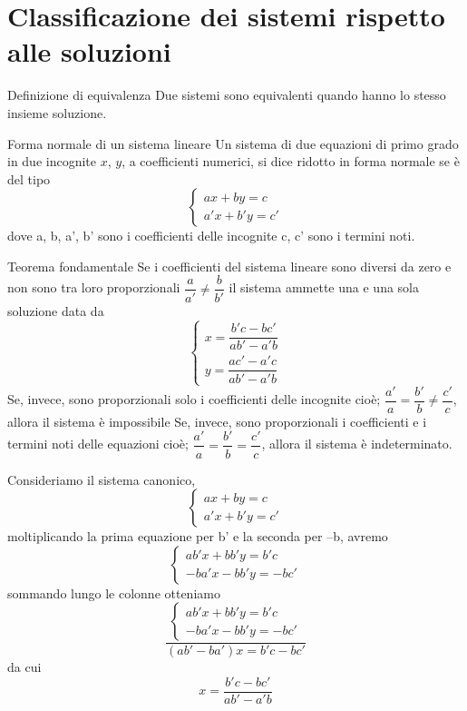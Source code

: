 \section[Classificazione rispetto alle soluzioni]{Classificazione dei sistemi rispetto alle soluzioni}
\begin{definizionet}{Definizione di equivalenza}{}
Due sistemi sono equivalenti quando hanno lo stesso insieme soluzione.
\end{definizionet}
\begin{definizionet}{Forma normale di un sistema lineare}{}
Un sistema di due equazioni di primo grado in due incognite $x$, $y$, a coefficienti numerici, si dice ridotto in forma normale se è del tipo
\[\left\{\begin{array}{l} {ax+by=c} \\ {a'x+b'y=c'}\end{array}\right. \]
dove a, b, a', b' sono i coefficienti delle incognite c, c' sono i termini noti.
\end{definizionet}
\begin{teoremat}{Teorema fondamentale}{}
Se i coefficienti del sistema lineare sono diversi da zero e non sono tra loro proporzionali $\dfrac{a}{a'} \ne \dfrac{b}{b'}$ il sistema ammette una e una sola soluzione data da
\[
\begin{cases}
	x=\dfrac{b'c-bc'}{ab'-a'b}\\
	y=\dfrac{ac'-a'c}{ab'-a'b}
\end{cases}
\]
Se, invece, sono proporzionali solo i coefficienti delle incognite cioè; $\dfrac{a'}{a} =\dfrac{b'}{b} \ne \dfrac{c'}{c} $, allora il sistema è impossibile
Se, invece, sono proporzionali i coefficienti e i termini noti delle equazioni cioè; $\dfrac{a'}{a} =\dfrac{b'}{b} =\dfrac{c'}{c} $, allora il sistema è indeterminato.
\end{teoremat}
Consideriamo il sistema canonico, \[ \left\{\begin{array}{l} {ax+by=c} \\ {a'x+b'y=c'} \end{array}\right. \]
moltiplicando la prima equazione per b' e la seconda per --b, avremo  \[\left\{\begin{array}{l} {ab'x+bb'y=b'c} \\ {-ba'x-bb'y=-bc'} \end{array}\right. \]
sommando lungo le colonne otteniamo \[\dfrac{\left\{\begin{array}{l} {ab'x+bb'y=b'c} \\ {-ba'x-bb'y=-bc'} \end{array}\right. }{\left(ab'-ba'\right)x=b'c-bc'} \]  da cui  \[x=\dfrac{b'c-bc'}{ab'-a'b} \]
